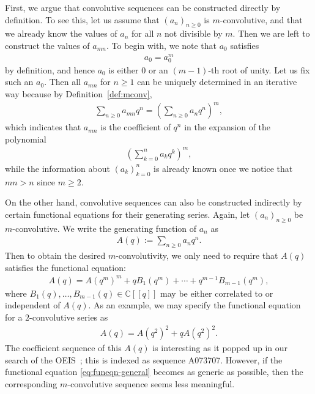 \documentclass[12pt,reqno]{amsart}
\numberwithin{equation}{section}
\theoremstyle{plain}
\theoremstyle{definition}
\theoremstyle{named}
\begin{document}
First, we argue that convolutive sequences can be constructed directly by definition. To see this, let us assume that $(a_n)_{n\ge 0}$ is $m$-convolutive, and that we already know the values of $a_n$ for all $n$ not divisible by $m$. Then we are left to construct the values of $a_{mn}$. To begin with, we note that $a_0$ satisfies
\begin{align*}
	a_0 = a_0^m
\end{align*}
by definition, and hence $a_0$ is either $0$ or an $(m-1)$-th root of unity. Let us fix such an $a_0$. Then all $a_{mn}$ for $n\ge 1$ can be uniquely determined in an iterative way because by Definition~\ref{def:mconv},
\begin{align*}
	\sum_{n\ge 0} a_{mn} q^n = \left(\sum_{n\ge 0} a_n q^n\right)^m,
\end{align*}
which indicates that $a_{mn}$ is the coefficient of $q^n$ in the expansion of the polynomial
\begin{align*}
	\left(\sum_{k=0}^n a_k q^k\right)^m,
\end{align*}
while the information about $(a_k)_{k=0}^n$ is already known once we notice that $mn>n$ since $m\ge 2$.

On the other hand, convolutive sequences can also be constructed indirectly by certain functional equations for their generating series. Again, let $(a_n)_{n\ge 0}$ be $m$-convolutive. We write the generating function of $a_n$ as
\begin{align*}
	A(q) := \sum_{n\ge 0} a_n q^n.
\end{align*}
Then to obtain the desired $m$-convolutivity, we only need to require that $A(q)$ satisfies the functional equation:
\begin{align}\label{eq:funeqn-general}
	A(q) = A(q^m)^m + q B_1(q^m) + \cdots + q^{m-1} B_{m-1}(q^m),
\end{align}
where $B_1(q),\ldots,B_{m-1}(q)\in \mathbb{C}[[q]]$ may be either correlated to or independent of $A(q)$. As an example, we may specify the functional equation for a $2$-convolutive series as
\begin{align}\label{eq:A073707}
	A(q) = A(q^2)^2+qA(q^2)^2.
\end{align}
The coefficient sequence of this $A(q)$ is  interesting as it popped up in our search of the OEIS~\cite{OEIS}; this is indexed as sequence A073707. However, if the functional equation \eqref{eq:funeqn-general} becomes as generic as possible, then the corresponding $m$-convolutive sequence seems less meaningful.
\end{document}
